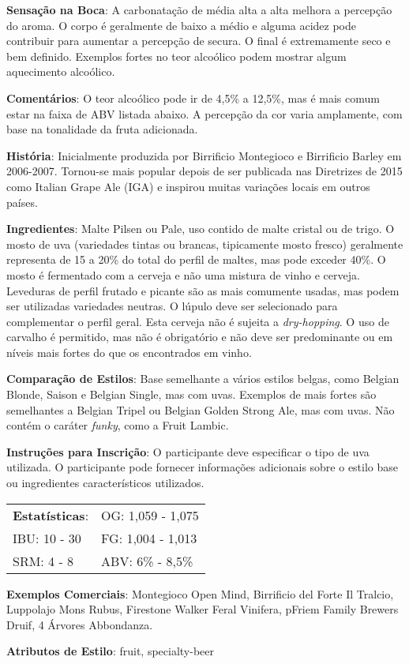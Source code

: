 \textbf{Sensação na Boca}: A carbonatação de média alta a alta melhora a percepção do aroma. O corpo é geralmente de baixo a médio e alguma acidez pode contribuir para aumentar a percepção de secura. O final é extremamente seco e bem definido. Exemplos fortes no teor alcoólico podem mostrar algum aquecimento alcoólico.

\textbf{Comentários}: O teor alcoólico pode ir de 4,5\% a 12,5\%, mas é mais comum estar na faixa de ABV listada abaixo. A percepção da cor varia amplamente, com base na tonalidade da fruta adicionada.

\textbf{História}: Inicialmente produzida por Birrificio Montegioco e Birrificio Barley em 2006-2007. Tornou-se mais popular depois de ser publicada nas Diretrizes de 2015 como Italian Grape Ale (IGA) e inspirou muitas variações locais em outros países.

\textbf{Ingredientes}: Malte Pilsen ou Pale, uso contido de malte cristal ou de trigo. O mosto de uva (variedades tintas ou brancas, tipicamente mosto fresco) geralmente representa de 15 a 20\% do total do perfil de maltes, mas pode exceder 40\%. O mosto é fermentado com a cerveja e não uma mistura de vinho e cerveja. Leveduras de perfil frutado e picante são as mais comumente usadas, mas podem ser utilizadas variedades neutras. O lúpulo deve ser selecionado para complementar o perfil geral. Esta cerveja não é sujeita a \textit{dry-hopping}. O uso de carvalho é permitido, mas não é obrigatório e não deve ser predominante ou em níveis mais fortes do que os encontrados em vinho.

\textbf{Comparação de Estilos}: Base semelhante a vários estilos belgas, como Belgian Blonde, Saison e Belgian Single, mas com uvas. Exemplos de mais fortes são semelhantes a Belgian Tripel ou Belgian Golden Strong Ale, mas com uvas. Não contém o caráter \textit{funky}, como a Fruit Lambic.

\textbf{Instruções para Inscrição}: O participante deve especificar o tipo de uva utilizada. O participante pode fornecer informações adicionais sobre o estilo base ou ingredientes característicos utilizados.

\begin{tabular}{@{}p{35mm}p{35mm}@{}}
  \textbf{Estatísticas}: & OG: 1,059 - 1,075 \\
  IBU: 10 - 30  & FG: 1,004 - 1,013  \\
  SRM: 4 - 8  & ABV: 6\% - 8,5\%
\end{tabular}

\textbf{Exemplos Comerciais}: Montegioco Open Mind, Birrificio del Forte Il Tralcio, Luppolajo Mons Rubus, Firestone Walker Feral Vinifera, pFriem Family Brewers Druif, 4 Árvores Abbondanza.

\textbf{Atributos de Estilo}: fruit, specialty-beer
